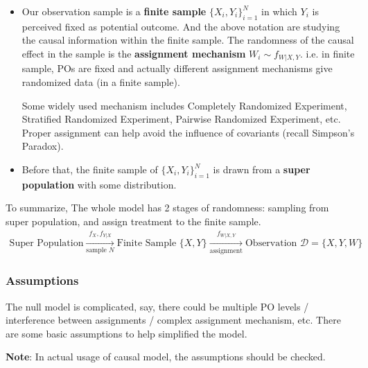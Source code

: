 \begin{itemize}[topsep=2pt,itemsep=0pt]
    \item Our observation sample is a \textbf{finite sample} $\{X_i,Y_i\}_{i=1}^N $ in which $ Y_i $ is perceived fixed as potential outcome. And the above notation are studying the causal information within the finite sample. The randomness of the causal effect in the sample is the \textbf{assignment mechanism} $ W_i\sim f_{W|X,Y} $. i.e. in finite sample, POs are fixed and actually different assignment mechanisms give randomized data (in a finite sample).
    
    Some widely used mechanism includes Completely Randomized Experiment, Stratified Randomized Experiment, Pairwise Randomized Experiment, etc. Proper assignment can help avoid the influence of covariants (recall Simpson's Paradox).
    \item Before that, the finite sample of $ \{X_i,Y_i\}_{i=1}^N $ is drawn from a \textbf{super population} with some distribution.
\end{itemize}

    To summarize, The whole model has 2 stages of randomness: sampling from super population, and assign treatment to the finite sample.
\begin{align}
    \text{Super Population}\xrightarrow[\text{sample }N]{f_{X}, f_{Y|X}}\text{Finite Sample }\{X,Y\}\xrightarrow[\text{assignment}]{f_{W|X,Y}}\text{Observation }\mathcal{D}=\{X,Y,W\}
\end{align}


\subsubsection{Assumptions}

The null model is complicated, say, there could be multiple PO levels / interference between assignments / complex assignment mechanism, etc. There are some basic assumptions to help simplified the model.

\textbf{Note}: In actual usage of causal model, the assumptions should be checked.  

